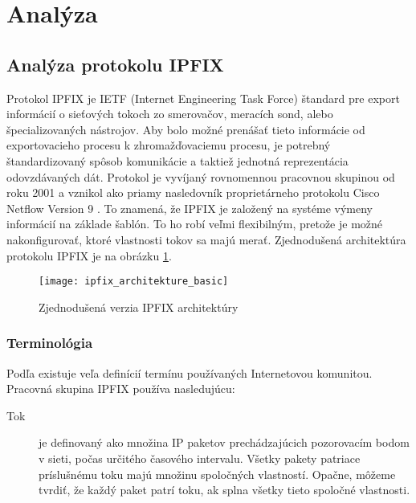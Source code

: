 \section{Anal\'yza}

\subsection{Anal\'yza protokolu IPFIX}

Protokol IPFIX \citep{rfc5101, ipfixProtocol, juvhaugen, veri} je IETF (Internet Engineering Task Force)
štandard pre export informácií o sieťových tokoch zo smerovačov, meracích sond, 
alebo špecializovaných nástrojov. 
Aby bolo možné prenášať tieto informácie 
od exportovacieho procesu k zhromažďovaciemu procesu, je potrebný štandardizovaný 
spôsob komunikácie a taktiež jednotná reprezentácia odovzdávaných dát.
Protokol je vyvíjaný rovnomennou pracovnou skupinou \citep{ipfixCharter} od roku 2001 a 
vznikol ako priamy nasledovník proprietárneho protokolu Cisco Netflow Version 9 \citep{rfc3954}. 
To znamená, že IPFIX je založený na systéme výmeny informácií na základe šablón. To ho robí veľmi
flexibilným, pretože je možné nakonfigurovať, ktoré vlastnosti tokov sa majú merať.
Zjednodušená architektúra protokolu IPFIX je na obrázku \ref{o:ipfix_architekture_basic}.

\begin{figure}[ht!]
\centering
\texttt{[image: ipfix\_architekture\_basic]}
\caption{Zjednodušená verzia IPFIX architektúry}\label{o:ipfix_architekture_basic}
\end{figure}

\subsubsection{Terminológia} \label{sec:ipfix_terminology}

Podľa \citep{rfc3917} existuje veľa definícií termínu  používaných Internetovou komunitou.
Pracovná skupina IPFIX používa nasledujúcu:
\begin{description}
  \item[Tok] je definovaný ako množina IP paketov prechádzajúcich pozorovacím bodom v sieti, počas určitého 
časového intervalu. Všetky pakety patriace príslušnému toku majú množinu spoločných vlastností. Opačne, 
môžeme tvrdiť, že každý paket patrí toku, ak splna všetky tieto spoločné vlastnosti. 
\end{description}


